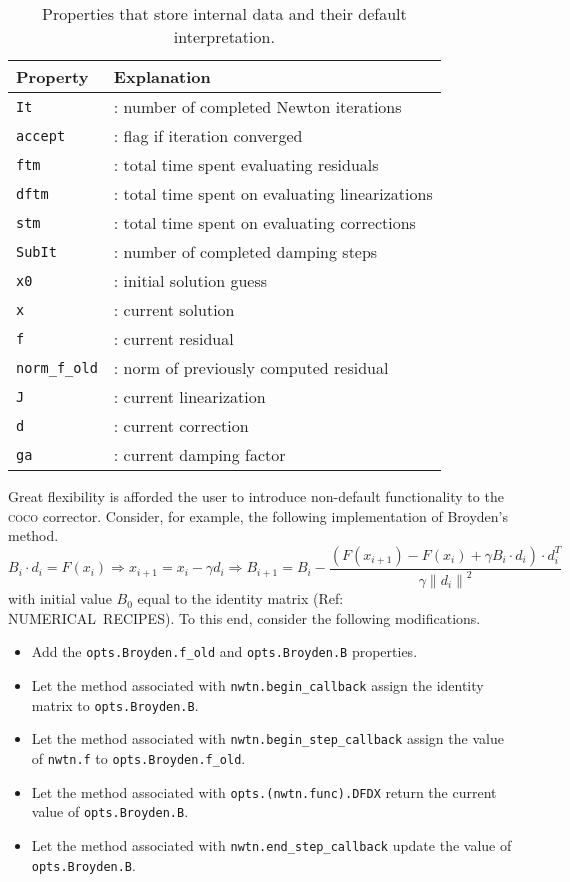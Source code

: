 \documentclass{article}
\begin{document}
\begin{table}[h]
\caption{Properties that store internal data and their default
interpretation.}
\label{table: Newton3}\centering%
\begin{tabular}{|ll|}
\hline
Property & Explanation \\ \hline
\texttt{It} & : number of completed Newton iterations \\ 
\texttt{accept} & : flag if iteration converged \\ 
\texttt{ftm} & : total time spent evaluating residuals \\ 
\texttt{dftm} & : total time spent on evaluating linearizations \\ 
\texttt{stm} & : total time spent on evaluating corrections \\ 
\texttt{SubIt} & : number of completed damping steps \\ 
\texttt{x0} & : initial solution guess \\ 
\texttt{x} & : current solution \\ 
\texttt{f} & : current residual \\ 
\texttt{norm\_f\_old} & : norm of previously computed residual \\ 
\texttt{J} & : current linearization \\ 
\texttt{d} & : current correction \\ 
\texttt{ga} & : current damping factor \\ \hline
\end{tabular}%
\end{table}

Great flexibility is afforded the user to introduce non-default
functionality to the \textsc{coco} corrector. Consider, for example, the
following implementation of Broyden's method.%
\[
B_{i}\cdot d_{i}=F\left( x_{i}\right) \Rightarrow x_{i+1}=x_{i}-\gamma
d_{i}\Rightarrow B_{i+1}=B_{i}-\frac{\left( F\left( x_{i+1}\right) -F\left(
x_{i}\right) +\gamma B_{i}\cdot d_{i}\right) \cdot d_{i}^{T}}{\gamma \left\|
d_{i}\right\| ^{2}} 
\]%
with initial value $B_{0}$ equal to the identity matrix (Ref: NUMERICAL\
RECIPES). To this end, consider the following modifications.

\begin{itemize}
\item Add the \texttt{opts.Broyden.f\_old} and \texttt{opts.Broyden.B}
properties.

\item Let the method associated with \texttt{nwtn.begin\_callback} assign
the identity matrix to \texttt{opts.Broyden.B}.

\item Let the method associated with \texttt{nwtn.begin\_step\_callback}
assign the value of \texttt{nwtn.f} to \texttt{opts.Broyden.f\_old}.

\item Let the method associated with \texttt{opts.(nwtn.func).DFDX} return
the current value of \texttt{opts.Broyden.B}.

\item Let the method associated with \texttt{nwtn.end\_step\_callback}
update the value of \texttt{opts.Broyden.B}.
\end{itemize}
\end{document}
